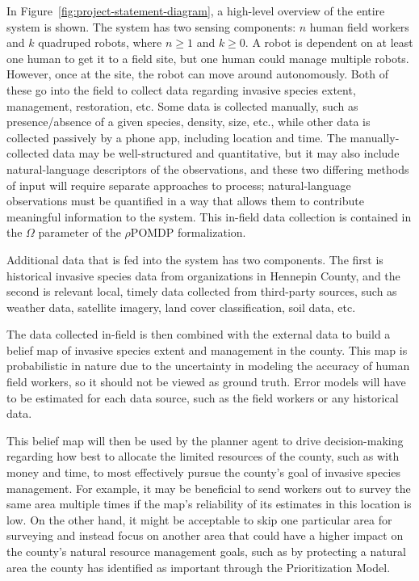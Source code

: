 \documentclass{article}
\begin{document}
In Figure~\ref{fig:project-statement-diagram}, a high-level overview of the entire system is shown. The system has two sensing components: $n$ human field workers and $k$ quadruped robots, where $n \geq 1$ and $k \geq 0$. A robot is dependent on at least one human to get it to a field site, but one human could manage multiple robots. However, once at the site, the robot can move around autonomously. Both of these go into the field to collect data regarding invasive species extent, management, restoration, etc. Some data is collected manually, such as presence/absence of a given species, density, size, etc., while other data is collected passively by a phone app, including location and time. The manually-collected data may be well-structured and quantitative, but it may also include natural-language descriptors of the observations, and these two differing methods of input will require separate approaches to process; natural-language observations must be quantified in a way that allows them to contribute meaningful information to the system. This in-field data collection is contained in the $\Omega$ parameter of the $\rho$POMDP formalization.

Additional data that is fed into the system has two components. The first is historical invasive species data from organizations in Hennepin County, and the second is relevant local, timely data collected from third-party sources, such as weather data, satellite imagery, land cover classification, soil data, etc.

The data collected in-field is then combined with the external data to build a belief map of invasive species extent and management in the county. This map is probabilistic in nature due to the uncertainty in modeling the accuracy of human field workers, so it should not be viewed as ground truth. Error models will have to be estimated for each data source, such as the field workers or any historical data.

This belief map will then be used by the planner agent to drive decision-making regarding how best to allocate the limited resources of the county, such as with money and time, to most effectively pursue the county’s goal of invasive species management. For example, it may be beneficial to send workers out to survey the same area multiple times if the map’s reliability of its estimates in this location is low. On the other hand, it might be acceptable to skip one particular area for surveying and instead focus on another area that could have a higher impact on the county’s natural resource management goals, such as by protecting a natural area the county has identified as important through the Prioritization Model.
\end{document}
